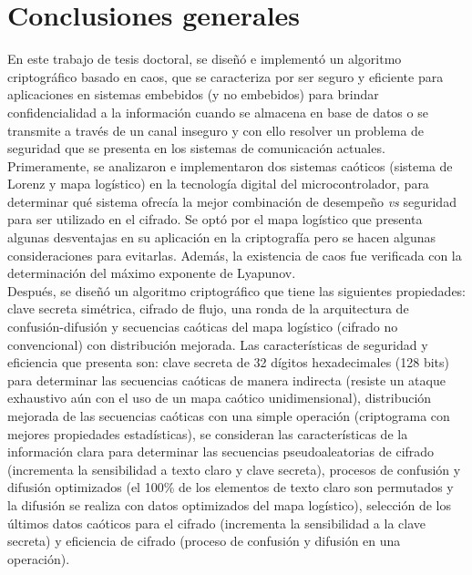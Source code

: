 
\chapter{Conclusiones generales}
En este trabajo de tesis doctoral, se diseñó e implementó un algoritmo criptográfico basado en caos, que se caracteriza por ser seguro y eficiente para aplicaciones en sistemas embebidos (y no embebidos) para brindar confidencialidad a la información cuando se almacena en base de datos o se transmite a través de un canal inseguro y con ello resolver un problema de seguridad que se presenta en los sistemas de comunicación actuales. \\

Primeramente, se analizaron e implementaron dos sistemas caóticos (sistema de Lorenz y mapa logístico) en la tecnología digital del microcontrolador, para determinar qué sistema ofrecía la mejor combinación de desempeño \textit{vs} seguridad para ser utilizado en el cifrado. Se optó por el mapa logístico que presenta algunas desventajas en su aplicación en la criptografía pero se hacen algunas consideraciones para evitarlas. Además, la existencia de caos fue verificada con la determinación del máximo exponente de Lyapunov.  \\

Después, se diseñó un algoritmo criptográfico que tiene las siguientes propiedades: clave secreta simétrica, cifrado de flujo, una ronda de la arquitectura de confusión-difusión y secuencias caóticas del mapa logístico (cifrado no convencional) con distribución mejorada. Las características de seguridad y eficiencia que presenta son: clave secreta de 32 dígitos hexadecimales (128 bits) para determinar las secuencias caóticas de manera indirecta (resiste un ataque exhaustivo aún con el uso de un mapa caótico unidimensional), distribución mejorada de las secuencias caóticas con una simple operación (criptograma con mejores propiedades estadísticas), se consideran las características de la información clara para determinar las secuencias pseudoaleatorias de cifrado (incrementa la sensibilidad a texto claro y clave secreta), procesos de confusión y difusión optimizados (el 100\% de los elementos de texto claro son permutados y la difusión se realiza con datos optimizados del mapa logístico), selección de los últimos datos caóticos para el cifrado (incrementa la sensibilidad a la clave secreta) y eficiencia de cifrado (proceso de confusión y difusión en una operación).  \\   

